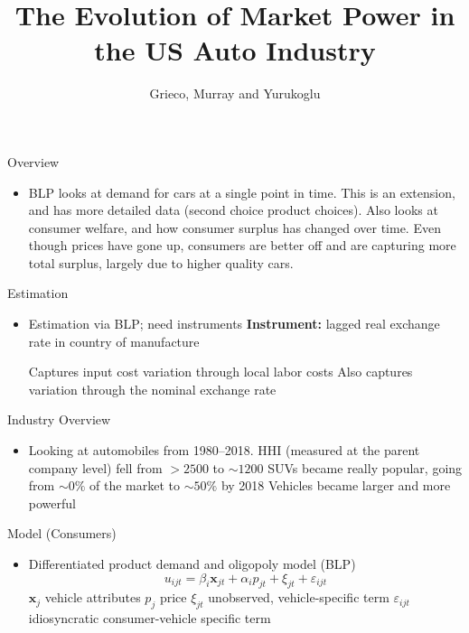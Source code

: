 \documentclass{beamer}
\title{The Evolution of Market Power in the US Auto Industry}
\author{Grieco, Murray and Yurukoglu}
\begin{document}
\maketitle
\begin{frame}{Overview}
  \begin{itemize}
  \item BLP looks at demand for cars at a single point in time.
    \vitem This is an extension, and has more detailed data (second choice product choices).
    \vitem Also looks at consumer welfare, and how consumer surplus has changed over time.
    \vitem Even though prices have gone up, consumers are better off and are capturing more total surplus, largely due to higher quality cars.
  \end{itemize}
\end{frame}
%
\begin{frame}{Estimation}
  \begin{itemize}
  \item Estimation via BLP; need instruments
    \vitem \textbf{Instrument:} lagged real exchange rate in country of manufacture
    \begin{itemize}
    \vitem Captures input cost variation through local labor costs
      \vitem Also captures variation through the nominal exchange rate
    \end{itemize}
  \end{itemize}
\end{frame}
%
\begin{frame}{Industry Overview}
  \begin{itemize}
  \item Looking at automobiles from 1980--2018.
    \vitem HHI (measured at the parent company level) fell from $>2500$ to $\sim\! 1200$
    \vitem SUVs became really popular, going from $\sim\! 0\%$ of the market to $\sim\! 50\%$ by 2018
    \vitem Vehicles became larger and more powerful
  \end{itemize}
\end{frame}
%
\begin{frame}{Model (Consumers)}
  \begin{itemize}
  \item Differentiated product demand and oligopoly model (BLP)
    \[
u_{ijt} = \beta_i \mathbf{x}_{jt} + \alpha_i p_{jt} + \xi_{jt} + \varepsilon_{ijt}
    \]
    \vitem $\mathbf{x}_j$ vehicle attributes
    \vitem $p_j$ price
    \vitem $\xi_{jt}$ unobserved, vehicle-specific term
    \vitem $\varepsilon_{ijt}$ idiosyncratic consumer-vehicle specific term
  \end{itemize}
\end{frame}
\end{document}
